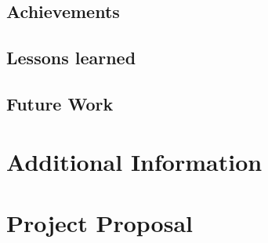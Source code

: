 \documentclass[12pt,a4paper,twoside,openany]{report} \usepackage[pdfborder={0 0 0}]{hyperref}    %
\theoremstyle{definition} \newtheorem{definition}{Definition}[section]
\begin{document}
      \section{Achievements}

      \section{Lessons learned}

      \section{Future Work}




      \nocite{*}
      



      \appendix

      \chapter{Additional Information}

%
%
%
%
%


      \chapter{Project Proposal} \label{chap:proposal} 

        
\end{document}
